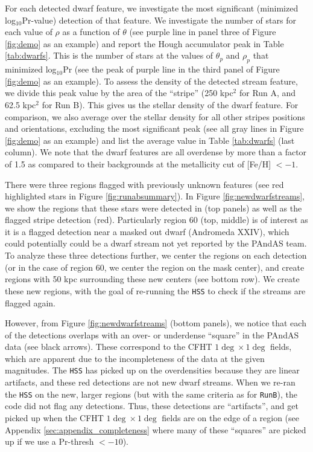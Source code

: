 \documentclass[twocolumn]{aastex631}
\begin{document}
For each detected dwarf feature, we investigate the most significant (minimized log$_{10}$Pr-value) detection of that feature. We investigate the number of stars for each value of $\rho$ as a function of $\theta$ (see purple line in panel three of Figure \ref{fig:demo} as an example) and report the Hough accumulator peak in Table \ref{tab:dwarfs}. This is the number of stars at the values of $\theta_p$ and $\rho_p$ that minimized log$_{10}$Pr (see the peak of purple line in the third panel of Figure \ref{fig:demo} as an example). To assess the density of the detected stream feature, we divide this peak value by the area of the ``stripe'' (250 kpc$^2$ for Run A, and 62.5 kpc$^2$ for Run B). This gives us the stellar density of the dwarf feature. For comparison, we also average over the stellar density for all other stripes positions and orientations, excluding the most significant peak (see all gray lines in Figure \ref{fig:demo} as an example) and list the average value in Table \ref{tab:dwarfs} (last column). We note that the dwarf features are all overdense by more than a factor of 1.5 as compared to their backgrounds at the metallicity cut of [Fe/H] $< -1$.

There were three regions flagged with previously unknown features (see red highlighted stars in Figure \ref{fig:runabsummary}). In Figure \ref{fig:newdwarfstreams}, we show the regions that these stars were detected in (top panels) as well as the flagged stripe detection (red). Particularly region 60 (top, middle) is of interest as it is a flagged detection near a masked out dwarf (Andromeda XXIV), which could potentially could be a dwarf stream not yet reported by the PAndAS team. To analyze these three detections further, we center the regions on each detection (or in the case of region 60, we center the region on the mask center), and create regions with 50 kpc surrounding these new centers (see bottom row). We create these new regions, with the goal of re-running the \texttt{HSS} to check if the streams are flagged again.

However, from Figure \ref{fig:newdwarfstreams} (bottom panels), we notice that each of the detections overlaps with an over- or underdense ``square'' in the PAndAS data (see black arrows). These correspond  to the CFHT $1\deg \times1 \deg$ fields, which are apparent due to the incompleteness of the data at the given magnitudes. The \texttt{HSS} has picked up on the overdensities because they are linear artifacts, and these red detections are not new dwarf streams. When we re-ran the \texttt{HSS} on the new, larger regions (but with the same criteria as for \texttt{RunB}), the code did not flag any detections. Thus, these detections are ``artifacts'', and get picked up when the CFHT $1\deg \times1 \deg$ fields are on the edge of a region (see Appendix \ref{sec:appendix_completeness} where many of these ``squares'' are picked up if we use a Pr-thresh $<-10$). 
\end{document}
